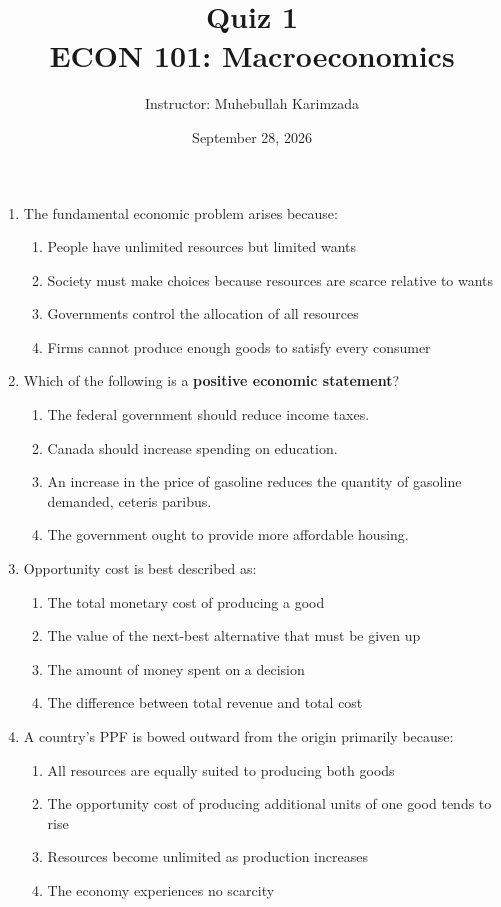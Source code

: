 \documentclass[12pt]{article}
\title{\textbf{Quiz 1} \vspace{0.4cm}\\ECON 101: Macroeconomics}
\author{Instructor: Muhebullah Karimzada}
\date{September 28, 2026}
\begin{document}
\maketitle




\begin{enumerate}

    \item The fundamental economic problem arises because:
    \begin{enumerate}[label=\Alph*.]
        \item People have unlimited resources but limited wants
        \item Society must make choices because resources are scarce relative to wants
        \item Governments control the allocation of all resources
        \item Firms cannot produce enough goods to satisfy every consumer
    \end{enumerate}

    \item Which of the following is a \textbf{positive economic statement}?
    \begin{enumerate}[label=\Alph*.]
        \item The federal government should reduce income taxes.
        \item Canada should increase spending on education.
        \item An increase in the price of gasoline reduces the quantity of gasoline demanded, ceteris paribus.
        \item The government ought to provide more affordable housing.
    \end{enumerate}

    \item Opportunity cost is best described as:
    \begin{enumerate}[label=\Alph*.]
        \item The total monetary cost of producing a good
        \item The value of the next-best alternative that must be given up
        \item The amount of money spent on a decision
        \item The difference between total revenue and total cost
    \end{enumerate}

    \item A country's PPF is bowed outward from the origin primarily because:
    \begin{enumerate}[label=\Alph*.]
        \item All resources are equally suited to producing both goods
        \item The opportunity cost of producing additional units of one good tends to rise
        \item Resources become unlimited as production increases
        \item The economy experiences no scarcity
    \end{enumerate}


\end{enumerate}
\end{document}
